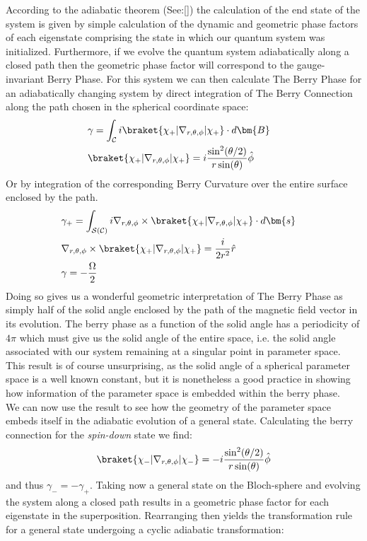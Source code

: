\documentclass{article}
\begin{document}
According to the adiabatic theorem (See:\ref{}) the calculation of the end state of the system is given by simple calculation of the dynamic and geometric phase factors of each eigenstate comprising the state in which our quantum system was initialized. Furthermore, if we evolve the quantum system adiabatically along a closed path then the geometric phase factor will correspond to the gauge-invariant Berry Phase. For this system we can then calculate The Berry Phase for an adiabatically changing system by direct integration of The Berry Connection along the path chosen in the spherical coordinate space:
  \begin{align*}
    &\gamma = \int_{\mathcal{C}} i \braket{\chi_{+}|\nabla_{r, \theta, \phi}|\chi_{+}} \cdot
    d\bm{B}&\\
    &\braket{\chi_{+}|\nabla_{r, \theta, \phi}|\chi_{+}} = i \frac{\sin^{2}(\theta /
        2)}{r \sin(\theta)} \hat{\phi}
  \end{align*}
Or by integration of the corresponding Berry Curvature over the entire surface enclosed by the path.
  \begin{align*}
    &\gamma_{+} = \int_{\mathcal{S}(\mathcal{C})} i \nabla_{r, \theta, \phi} \times
     \braket{\chi_{+}|\nabla_{r, \theta, \phi}|\chi_{+}} \cdot d\bm{s}&\\
    &\nabla_{r, \theta, \phi} \times
      \braket{\chi_{+}|\nabla_{r, \theta, \phi}|\chi_{+}} = \frac{i}{2r^{2}}\hat{r}&\\
    &\gamma = -\frac{\Omega}{2}
   \end{align*}
Doing so gives us a wonderful geometric interpretation of The Berry Phase as simply half of the solid angle enclosed by the path of the magnetic field vector in its evolution. The berry phase as a function of the solid angle has a periodicity of $4\pi$ which must give us the solid angle of the entire space, i.e. the solid angle associated with our system remaining at a singular point in parameter space. This result is of course unsurprising, as the solid angle of a spherical parameter space is a well known constant, but it is nonetheless a good practice in showing how information of the parameter space is embedded within the berry phase.\\

We can now use the result to see how the geometry of the parameter space embeds itself in the adiabatic evolution of a general state. Calculating the berry connection for the \textit{spin-down} state we find:
\begin{equation*}
  \braket{\chi_{-}|\nabla_{r, \theta, \phi}|\chi_{-}} = -i \frac{\sin^{2}(\theta /
  2)}{r \sin(\theta)} \hat{\phi}
\end{equation*}
and thus $\gamma_{-} = -\gamma_{+}$. Taking now a general state on the Bloch-sphere and evolving the system along a closed path results in a geometric phase factor for each eigenstate in the superposition. Rearranging then yields the transformation rule for a general state undergoing a cyclic adiabatic transformation:
\end{document}
